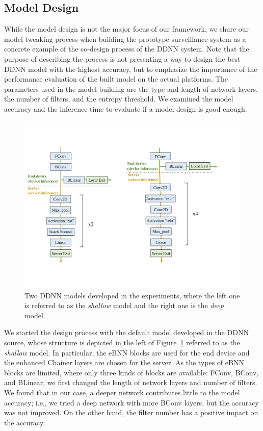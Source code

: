 \documentclass[conference]{IEEEtran}
\def\figurename{Figure}
\begin{document}
\subsection{Model Design}
\label{sec:modeldesign}

While the model design is not the major focus of our framework, we share our model tweaking process when building the prototype surveillance system as a concrete example of the co-design process of the DDNN system. Note that the purpose of describing the process is not presenting a way to design the best DDNN model with the highest accuracy, but to emphasize the importance of the performance evaluation of the built model on the actual platforms. The parameters used in the model building are the type and length of network layers, the number of filters, and the entropy threshold. We examined the model accuracy and the inference time to evaluate if a model design is good enough.

	\begin{figure}[tbh!!]
        \centering

        \includegraphics[width=.8\columnwidth]{figure/cifar10_weak_good.pdf}

        \caption{Two DDNN models developed in the experiments, where the left one is referred to as the \emph{shallow} model and the right one is the \emph{deep} model.}
        \label{fig:cifarmodels} %
    \end{figure}


We started the design process with the default model developed in the DDNN source, whose structure is depicted in the left of \figurename~\ref{fig:cifarmodels} referred to as the \emph{shallow} model. In particular, the eBNN blocks are used for the end device and the enhanced Chainer layers are chosen for the server. As the types of eBNN blocks are limited, where only three kinds of blocks are available: FConv, BConv, and BLinear, we first changed the length of network layers and number of filters. We found that in our case, a deeper network contributes little to the model accuracy; i.e., we tried a deep network with more BConv layers, but the accuracy was not improved. On the other hand, the filter number has a positive impact on the accuracy.
\end{document}
